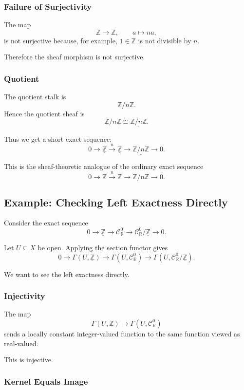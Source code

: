 \documentclass[12pt,a4paper]{article}
\newcommand{\RR}{\mathbb{R}}
\newcommand{\ZZ}{\mathbb{Z}}
\newcommand{\Czero}{\mathcal C^0}        %
\theoremstyle{notespace}
\begin{document}
\subsubsection*{Failure of Surjectivity}

The map
\[
\ZZ\to \ZZ,
\qquad
a\mapsto na,
\]
is not surjective because, for example, \(1\in \ZZ\) is not divisible by \(n\).

Therefore the sheaf morphism is not surjective.

\subsubsection*{Quotient}

The quotient stalk is
\[
\ZZ/n\ZZ.
\]
Hence the quotient sheaf is
\[
\underline{\ZZ}/n\underline{\ZZ}
\cong
\underline{\ZZ/n\ZZ}.
\]

Thus we get a short exact sequence:
\[
0\to \underline{\ZZ}
\xrightarrow{n}
\underline{\ZZ}
\to
\underline{\ZZ/n\ZZ}
\to 0.
\]

This is the sheaf-theoretic analogue of the ordinary exact sequence
\[
0\to \ZZ
\xrightarrow{n}
\ZZ
\to
\ZZ/n\ZZ
\to 0.
\]

\subsection{Example: Checking Left Exactness Directly}

Consider the exact sequence
\[
0\to \underline{\ZZ}
\to \Czero_{\RR}
\to \Czero_{\RR}/\underline{\ZZ}
\to 0.
\]

Let \(U\subseteq X\) be open. Applying the section functor gives
\[
0\to \Gamma(U,\underline{\ZZ})
\to \Gamma(U,\Czero_{\RR})
\to \Gamma(U,\Czero_{\RR}/\underline{\ZZ}).
\]

We want to see the left exactness directly.

\subsubsection*{Injectivity}

The map
\[
\Gamma(U,\underline{\ZZ})
\to
\Gamma(U,\Czero_{\RR})
\]
sends a locally constant integer-valued function to the same function viewed as real-valued.

This is injective.

\subsubsection*{Kernel Equals Image}
\end{document}

